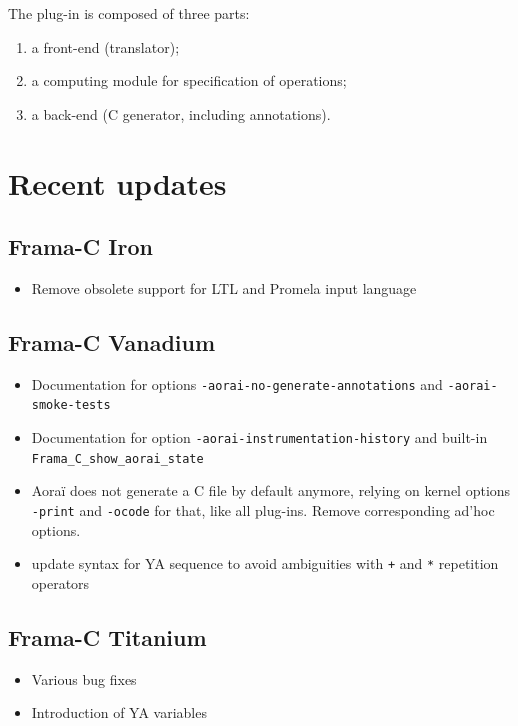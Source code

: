 \documentclass{frama-c-book}
\begin{document}
The plug-in is composed of three parts:
  \begin{enumerate}
    \item a front-end (translator);
    \item a computing module for specification of operations;
    \item a back-end (C generator, including annotations).
  \end{enumerate}


\section{Recent updates}

\subsection{Frama-C Iron}
\begin{itemize}
\item Remove obsolete support for LTL and Promela input language
\end{itemize}
\subsection{Frama-C Vanadium}
\begin{itemize}
\item Documentation for options \texttt{-aorai-no-generate-annotations}
and \texttt{-aorai-smoke-tests}
\item Documentation for option \texttt{-aorai-instrumentation-history}
and built-in \texttt{Frama\_C\_show\_aorai\_state}
\item Aoraï does not generate a C file by default anymore, relying on
kernel options \texttt{-print} and \texttt{-ocode} for that, like all
plug-ins. Remove corresponding ad'hoc options.
\item update syntax for YA sequence to avoid ambiguities with
 \texttt{+} and \texttt{*} repetition operators
\end{itemize}
\subsection{Frama-C Titanium}
\begin{itemize}
\item Various bug fixes
\item Introduction of YA variables
\end{itemize}
\end{document}
